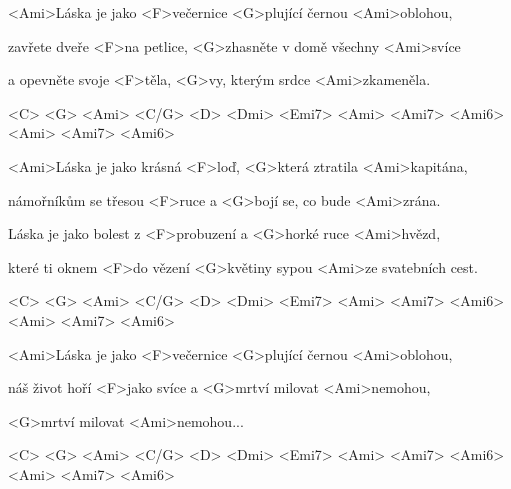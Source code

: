

\zs
<Ami>Láska je jako <F>večernice <G>plující černou <Ami>oblohou,

zavřete dveře <F>na petlice, <G>zhasněte v domě všechny <Ami>svíce

a opevněte svoje <F>těla, <G>vy, kterým srdce <Ami>zkameněla.

<C> <G> <Ami> <C/G> <D> <Dmi> <Emi7> <Ami> <Ami7> <Ami6> <Ami> <Ami7> <Ami6>
\ks

\zs
<Ami>Láska je jako krásná <F>loď, <G>která ztratila <Ami>kapitána,

námořníkům se třesou <F>ruce a <G>bojí se, co bude <Ami>zrána.

Láska je jako bolest z <F>probuzení a <G>horké ruce <Ami>hvězd,

které ti oknem <F>do vězení <G>květiny sypou <Ami>ze svatebních cest.

<C> <G> <Ami> <C/G> <D> <Dmi> <Emi7> <Ami> <Ami7> <Ami6> <Ami> <Ami7> <Ami6>
\ks

\zs
<Ami>Láska je jako <F>večernice <G>plující černou <Ami>oblohou,

náš život hoří <F>jako svíce a <G>mrtví milovat <Ami>nemohou,

<G>mrtví milovat <Ami>nemohou...

<C> <G> <Ami> <C/G> <D> <Dmi> <Emi7> <Ami> <Ami7> <Ami6> <Ami> <Ami7> <Ami6>
\ks

\kp
